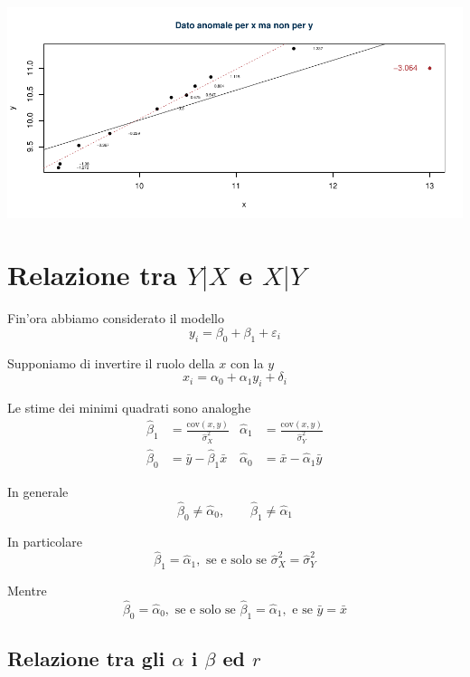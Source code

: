 \documentclass[
  11pt,
]{book}
\theoremstyle{mytheoremstyle}
\theoremstyle{mydefstyle}
\begin{document}
\begin{center}\includegraphics{Appunti_di_Statistica_2025_files/figure-latex/18-regressione-II-29-1} \end{center}

\section{\texorpdfstring{Relazione tra \(Y|X\) e \(X|Y\)}{Relazione tra Y\textbar X e X\textbar Y}}\label{relazione-tra-yx-e-xy}

Fin'ora abbiamo considerato il modello
\[y_i = \beta_0+\beta_1+\varepsilon_i\]

Supponiamo di invertire il ruolo della \(x\) con la \(y\)
\[x_i = \alpha_0+\alpha_1y_i+\delta_i\]

Le stime dei minimi quadrati sono analoghe
\[
\begin{aligned}
\hat\beta_1 &=\frac{\text{cov}(x,y)}{\hat\sigma_X^2} & \hat\alpha_1 &=\frac{\text{cov}(x,y)}{\hat\sigma_Y^2}\\
\hat\beta_0&=\bar y-\hat\beta_1\bar x & \hat\alpha_0 &=\bar x-\hat\alpha_1\bar y
\end{aligned}
\]

In generale
\[\hat\beta_0\neq\hat\alpha_0,\qquad\hat\beta_1\neq\hat\alpha_1\]

In particolare
\[\hat\beta_1=\hat\alpha_1, \text{ se e solo se }\hat\sigma_X^2=\hat\sigma_Y^2\]

Mentre
\[\hat\beta_0=\hat\alpha_0, \text{ se e solo se }\hat\beta_1=\hat\alpha_1, \text{ e se }\bar y=\bar x\]

\subsection{\texorpdfstring{Relazione tra gli \(\alpha\) i \(\beta\) ed \(r\)}{Relazione tra gli \textbackslash alpha i \textbackslash beta ed r}}\label{relazione-tra-gli-alpha-i-beta-ed-r}
\end{document}
